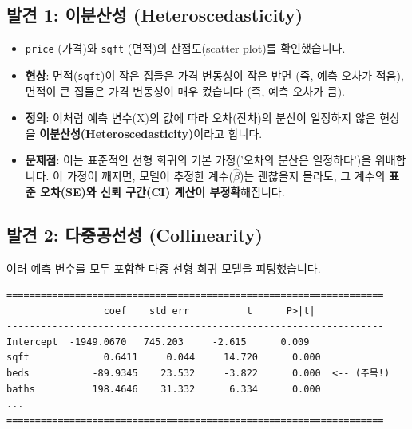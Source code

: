 \documentclass[11pt,a4paper]{book}
\theoremstyle{definition}
\begin{document}
\subsection{발견 1: 이분산성 (Heteroscedasticity)}

\begin{itemize}
    \item \texttt{price} (가격)와 \texttt{sqft} (면적)의 산점도(scatter plot)를 확인했습니다.
    \item \textbf{현상}: 면적(\texttt{sqft})이 작은 집들은 가격 변동성이 작은 반면 (즉, 예측 오차가 적음), 면적이 큰 집들은 가격 변동성이 매우 컸습니다 (즉, 예측 오차가 큼).
    \item \textbf{정의}: 이처럼 예측 변수(X)의 값에 따라 오차(잔차)의 분산이 일정하지 않은 현상을 \textbf{이분산성(Heteroscedasticity)}이라고 합니다.
    \item \textbf{문제점}: 이는 표준적인 선형 회귀의 기본 가정('오차의 분산은 일정하다')을 위배합니다. 이 가정이 깨지면, 모델이 추정한 계수($\hat{\beta}$)는 괜찮을지 몰라도, 그 계수의 \textbf{표준 오차(SE)와 신뢰 구간(CI) 계산이 부정확}해집니다.
\end{itemize}


\subsection{발견 2: 다중공선성 (Collinearity)}

여러 예측 변수를 모두 포함한 다중 선형 회귀 모델을 피팅했습니다.

\begin{tcolorbox}[colback=gray!10!white, colframe=black, title={다중 회귀 모델 결과 (일부)}]
\begin{verbatim}
==================================================================
                 coef    std err          t      P>|t|
------------------------------------------------------------------
Intercept  -1949.0670   745.203     -2.615      0.009
sqft             0.6411     0.044     14.720      0.000
beds           -89.9345    23.532     -3.822      0.000  <-- (주목!)
baths          198.4646    31.332      6.334      0.000
...
==================================================================
\end{verbatim}
\end{tcolorbox}
\end{document}
